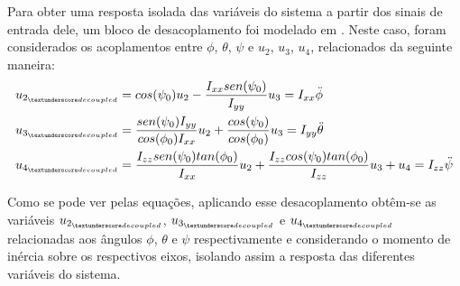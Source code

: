 Para obter uma resposta isolada das variáveis do sistema a partir dos sinais de entrada dele, um bloco de desacoplamento foi modelado em \cite[p.~62]{Balas2007}. Neste caso, foram considerados os acoplamentos entre $\phi$, $\theta$, $\psi$ e $u_2$, $u_3$, $u_4$, relacionados da seguinte maneira:
\begin{align}
u_{2_{\textunderscore decoupled}} &= cos(\psi_{0})u_2 - \frac{I_{xx}sen(\psi_{0})}{I_{yy}}u_3 = I_{xx}\ddot{\phi} \\
u_{3_{\textunderscore decoupled}} &= \frac{sen(\psi_{0})I_{yy}}{cos(\phi_{0})I_{xx}}u_2 + \frac{cos(\psi_{0})}{cos(\phi_{0})}u_3 = I_{yy}\ddot{\theta} \\
u_{4_{\textunderscore decoupled}} &= \frac{I_{zz}sen(\psi_0)tan(\phi_0)}{I_{xx}}u_2 + \frac{I_{zz}cos(\psi_0)tan(\phi_0)}{I_{zz}}u_3 + u_4 = I_{zz}\ddot{\psi} 
\end{align}

Como se pode ver pelas equações, aplicando esse desacoplamento obtêm-se as variáveis $u_{2_{\textunderscore decoupled}}$, $u_{3_{\textunderscore decoupled}}$ e $u_{4_{\textunderscore decoupled}}$ relacionadas aos ângulos $\phi$, $\theta$ e $\psi$ respectivamente e considerando o momento de inércia sobre os respectivos eixos, isolando assim a resposta das diferentes variáveis do sistema.

